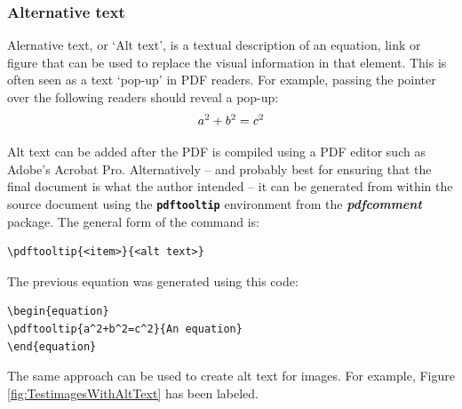 \documentclass[12pt,letterpaper]{article}
\newcommand{\packagename}[1]{\textbf{\emph{#1}}}
\newcommand{\envname}[1]{\textbf{\texttt{#1}}}
\begin{document}
\subsubsection{Alternative text}\label{sec:Alttext}
Alernative text, or `Alt text', is a textual description of an equation, link or figure that can be used to replace the visual information in that element. This is often seen as a text `pop-up' in PDF readers. For example, passing the pointer over the following readers should reveal a pop-up:
\begin{equation}
\pdftooltip{a^2+b^2=c^2}{An equation}
\end{equation}

Alt text can be added after the PDF is compiled using a PDF editor such as Adobe's Acrobat Pro. Alternatively -- and probably best for ensuring that the final document is what the author intended -- it can be generated from within the source document using the \envname{pdftooltip} environment from the \packagename{pdfcomment} package. The general form of the command is:

\begin{verbatim}
\pdftooltip{<item>}{<alt text>}
\end{verbatim}

The previous equation was generated using this code:

\begin{verbatim}
\begin{equation}
\pdftooltip{a^2+b^2=c^2}{An equation}
\end{equation}
\end{verbatim}

The same approach can be used to create alt text for images. For example, Figure \ref{fig:TestimagesWithAltText} has been labeled. 
\end{document}
